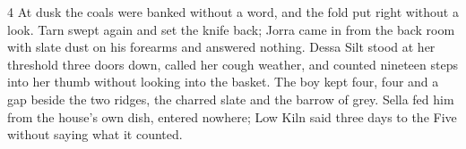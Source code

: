 \begin{CRchronicle}{4}
At dusk the coals were banked without a word, and the fold put right without a look. Tarn swept again and set the knife back; Jorra came in from the back room with slate dust on his forearms and answered nothing. Dessa Silt stood at her threshold three doors down, called her cough weather, and counted nineteen steps into her thumb without looking into the basket. The boy kept four, four and a gap beside the two ridges, the charred slate and the barrow of grey. Sella fed him from the house’s own dish, entered nowhere; Low Kiln said three days to the Five without saying what it counted.
\end{CRchronicle}
